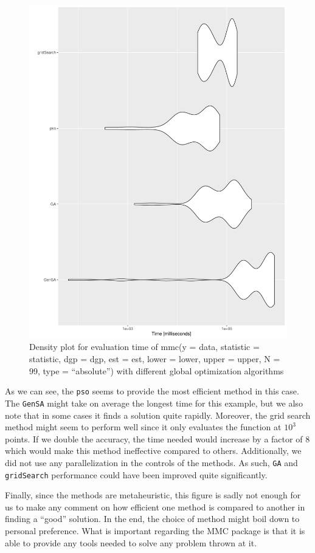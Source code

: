 \documentclass[]{article}\usepackage[]{graphicx}\usepackage[]{color}
\newcommand{\pkg}[1]{{\normalfont\fontseries{b}\selectfont #1}}
\let\code=\texttt
\begin{document}
\begin{figure}[H]
\centering
\includegraphics[width=0.9\linewidth]{fig/BF_compare}
\caption{Density plot for evaluation time of mmc(y = data, statistic = statistic, dgp = dgp, est = est, lower = lower, upper = upper, N = 99,	type = ``absolute'') with different global optimization algorithms}
\label{fig:bfcompare}
\end{figure}

As we can see, the \code{pso} seems to provide the most efficient method in this case. The \code{GenSA} might take on average the longest time for this example, but we also note that in some cases it finds a solution quite rapidly. Moreover, the grid search method might seem to perform well since it only evaluates the function at $10^3$ points. If we double the accuracy, the time needed would increase by a factor of 8 which would make this method ineffective compared to others. Additionally, we did not use any parallelization in the controls of the methods. As such, \code{GA} and \code{gridSearch} performance could have been improved quite significantly.

Finally, since the methods are metaheuristic, this figure is sadly not enough for us to make any comment on how efficient one method is compared to another in finding a ``good'' solution. In the end, the choice of method might boil down to personal preference. What is important regarding the \pkg{MMC} package is that it is able to provide any tools needed to solve any problem thrown at it.
\end{document}
